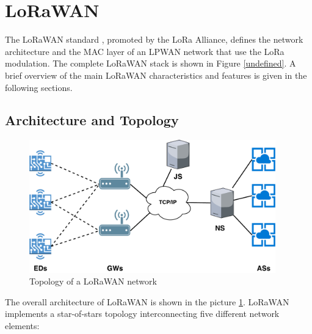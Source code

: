 \section{LoRaWAN}

The LoRaWAN standard \cite{undefined}, promoted by the LoRa Alliance, defines the network architecture and the MAC layer of an \gls{LPWAN} network that use the LoRa modulation. The complete LoRaWAN stack is shown in Figure \ref{undefined}. A brief overview of the main LoRaWAN characteristics and features is given in the following sections.

\subsection{Architecture and Topology}

\begin{figure}[h]
    \centering
    \includegraphics[width=0.95\textwidth]{images/lora-topology.pdf}
    \caption{Topology of a LoRaWAN network}
    \label{fig:lorawan-architecture}
\end{figure}

The overall architecture of LoRaWAN is shown in the picture \ref{fig:lorawan-architecture}.
LoRaWAN implements a star-of-stars topology interconnecting five different network elements:

